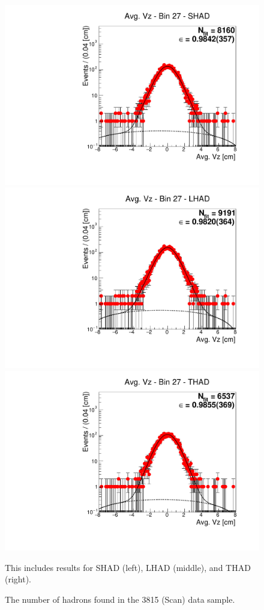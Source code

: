 \begin{figure}[H]
\centering
\includegraphics[scale=0.25]{figures/plots/nonDDbar_fit_results/scan/fit_scan_27_data_SHAD.pdf}
\hspace{-0.5cm}
\includegraphics[scale=0.25]{figures/plots/nonDDbar_fit_results/scan/fit_scan_27_data_LHAD.pdf}
\hspace{-0.5cm}
\includegraphics[scale=0.25]{figures/plots/nonDDbar_fit_results/scan/fit_scan_27_data_THAD.pdf}
\caption{The number of hadrons found in the 3815 (Scan) data sample.}
{This includes results for SHAD (left), LHAD (middle), and THAD (right).}
\label{fig:hadron_fits_scan_27}
\end{figure}

